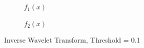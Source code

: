 \documentclass[12pt]{article}
\begin{document}
\begin{figure}
  \centering

  \begin{subfigure}[b]{0.85\textwidth}
    \caption{$f_1(x)$}
  \end{subfigure}
  \qquad
  \begin{subfigure}[b]{0.85\textwidth}
    \caption{$f_2(x)$}
  \end{subfigure}

  \caption{Inverse Wavelet Transform, Threshold = 0.1}
  \label{revwt}

\end{figure}
\end{document}

